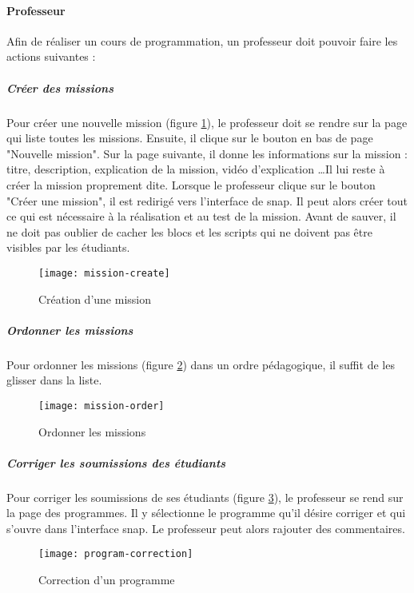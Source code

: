 \paragraph{Professeur}
Afin de réaliser un cours de programmation, un professeur doit pouvoir faire les actions suivantes :
\subparagraph{Créer des missions} Pour créer une nouvelle mission (figure \ref{fig:mission-create}), le professeur doit se rendre sur la page qui liste toutes les missions. Ensuite, il clique sur le bouton en bas de page "Nouvelle mission". Sur la page suivante, il donne les informations sur la mission : titre, description, explication de la mission, vidéo d'explication \ldots Il lui reste à créer la mission proprement dite. Lorsque le professeur clique sur le bouton "Créer une mission", il est redirigé vers l'interface de \gls{snap}. Il peut alors créer tout ce qui est nécessaire à la réalisation et au test de la mission. Avant de sauver, il ne doit pas oublier de cacher les \glspl{bloc} et les scripts qui ne doivent pas être visibles par les étudiants.
\begin{figure}
  \begin{center}
    \texttt{[image: mission-create]}
    \caption{Création d'une mission}
    \label{fig:mission-create}
  \end{center}
\end{figure}

\subparagraph{Ordonner les missions} Pour ordonner les missions (figure \ref{fig:mission-order}) dans un ordre pédagogique, il suffit de les glisser dans la liste.
\begin{figure}
  \begin{center}
    \texttt{[image: mission-order]}
    \caption{Ordonner les missions}
    \label{fig:mission-order}
  \end{center}
\end{figure}

\subparagraph{Corriger les soumissions des étudiants} Pour corriger les soumissions de ses étudiants (figure \ref{fig:program-correction}), le professeur se rend sur la page des programmes. Il y sélectionne le programme qu'il désire corriger et qui s'ouvre dans l'interface \gls{snap}. Le professeur peut alors rajouter des commentaires.
\begin{figure}
  \begin{center}
    \texttt{[image: program-correction]}
    \caption{Correction d'un programme}
    \label{fig:program-correction}
  \end{center}
\end{figure}

